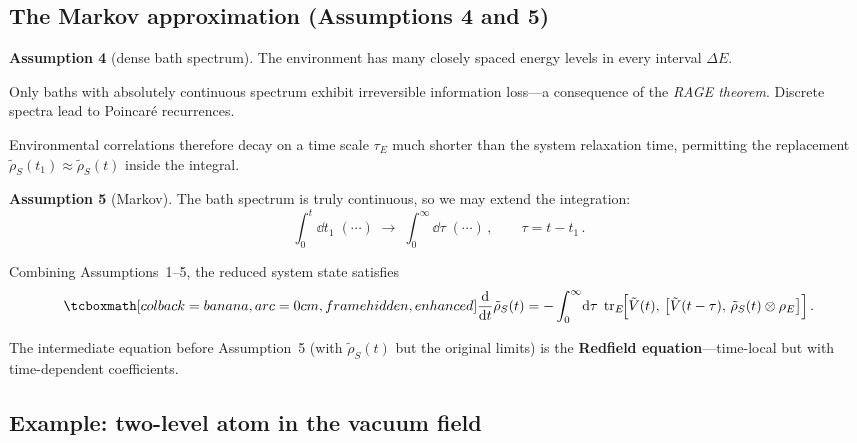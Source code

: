 \subsection{The Markov approximation (Assumptions 4 and 5)}%
\label{sec:markov-approx}

\textbf{Assumption 4} (dense bath spectrum).  The environment has
many closely spaced energy levels in every interval $\Delta E$.

\begin{intuition}
  Only baths with absolutely continuous spectrum exhibit irreversible
  information loss---a consequence of the \emph{RAGE theorem}.
  Discrete spectra lead to Poincar\'e recurrences.
\end{intuition}

Environmental correlations therefore decay on a time scale $\tau_E$
much shorter than the system relaxation time, permitting the
replacement $\tilde{\rho}_S(t_1)\approx\tilde{\rho}_S(t)$ inside
the integral.

\textbf{Assumption 5} (Markov).  The bath spectrum is truly
continuous, so we may extend the integration:
\begin{equation}\label{eq:markov-limit}
  \int_0^{t}\!\dd t_1\;(\cdots)
  \;\longrightarrow\;
  \int_0^{\infty}\!\dd\tau\;(\cdots)\,,
  \qquad \tau = t - t_1\,.
\end{equation}

\begin{keyresult}
  Combining Assumptions~1--5, the reduced system state satisfies
  \begin{equation}\label{eq:born-markov}
    \eqbox{
    \frac{\dd}{\dd t}\tilde{\rho}_S(t)
    = -\int_0^{\infty}\!\dd\tau\;
      \tr_E\!\Bigl[\tilde{V}(t),\,
        \bigl[\tilde{V}(t-\tau),\,
              \tilde{\rho}_S(t)\tp\rho_E\bigr]\Bigr]}\,.
  \end{equation}
\end{keyresult}

\begin{remark}
  The intermediate equation before Assumption~5 (with
  $\tilde{\rho}_S(t)$ but the original limits) is the
  \textbf{Redfield equation}---time-local but with time-dependent
  coefficients.
\end{remark}

\subsection{Example: two-level atom in the vacuum field}%
\label{sec:two-level-atom}

